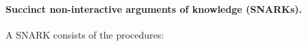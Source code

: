 

\paragraph{Succinct non-interactive arguments of knowledge (SNARKs).}
A SNARK consists of the procedures:
\vspace{-1ex}
